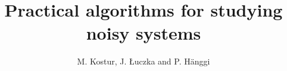 \documentclass[authoryear,draft,1p,times]{elsarticle}
\renewcommand{\=}{\stackrel{\mathrm{d}}{=}}
\begin{document}
\begin{frontmatter}



\title{Practical algorithms for studying noisy  systems }


\author{M. Kostur, J. {\L}uczka and P. H\"anggi}

\address{Institute of Physics, University of Augsburg, Augsburg, Germany}

\begin{abstract}


\end{abstract}
\end{frontmatter}
\end{document}
